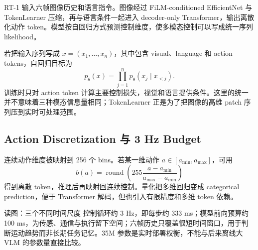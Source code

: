 RT-1 输入六帧图像历史和语言指令。图像经过 FiLM-conditioned EfficientNet 与 TokenLearner 压缩，再与语言条件一起进入 decoder-only Transformer，输出离散化动作 token。模型按自回归方式预测控制维度，使多模态控制可以写成统一序列 likelihood。


若把输入序列写成 $x=(x_1,\ldots,x_n)$，其中包含 visual、language 和 action tokens，自回归目标为
\begin{equation}
p_{\theta}(x)=\prod_{j=1}^{n}p_{\theta}(x_j\mid x_{<j}).
\end{equation}
训练时只对 action token 计算主要控制损失，视觉和语言提供条件。这里的统一并不意味着三种模态信息量相同；TokenLearner 正是为了把图像的高维 patch 序列压到实时可处理范围。

\subsection{Action Discretization 与 3 Hz Budget}

连续动作维度被映射到 256 个 bins。若某一维动作 $a\in[a_{\min},a_{\max}]$，可用
\begin{equation}
b(a)=\operatorname{round}\left(
255\frac{a-a_{\min}}{a_{\max}-a_{\min}}
\right)
\end{equation}
得到离散 token，推理后再映射回连续控制。量化把多维回归变成 categorical prediction，便于 Transformer 解码，但也引入有限精度和多维 token 依赖。


\begin{knowledgebox}{读图：三个不同时间尺度}
控制循环约 3 Hz，即每步约 333 ms；模型前向预算约 100 ms，为传感、通信与执行留下空间；六帧历史只覆盖很短时间窗口，用于判断运动趋势而非长期任务记忆。35M 参数是实时部署权衡，不能与后来离线大 VLM 的参数量直接比较。
\end{knowledgebox}


